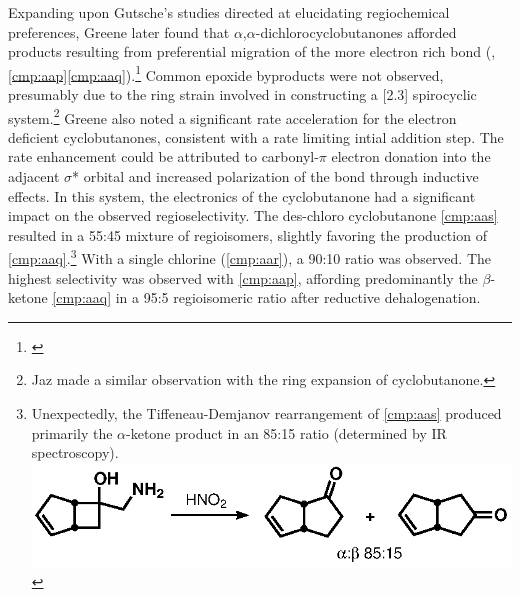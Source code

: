 Expanding upon Gutsche's studies directed at elucidating regiochemical
preferences, Greene later found that $\alpha$,$\alpha$-dichlorocyclobutanones
afforded products resulting from preferential migration of the more electron rich
 bond (,
\ref{cmp:aap}\ce{->}\ref{cmp:aaq}).\footnote{ \label{ref:greene}} Common
epoxide byproducts were not observed, presumably due to the ring strain involved in
constructing a [2.3] spirocyclic system.\footnote{Jaz made a similar observation
with the ring expansion of cyclobutanone. } Greene also noted a significant rate
acceleration for the electron deficient cyclobutanones, consistent with a rate
limiting intial addition step. The rate enhancement could be attributed to carbonyl-$\pi$
electron donation into the adjacent  $\sigma$* orbital and increased
polarization of the  bond through inductive effects. In this system, the
electronics of the cyclobutanone had a significant impact on the observed
regioselectivity. The des-chloro cyclobutanone \ref{cmp:aas} resulted in a 55:45
mixture of regioisomers, slightly favoring the production of
\ref{cmp:aaq}.\footnote{Unexpectedly, the Tiffeneau-Demjanov rearrangement of
\ref{cmp:aas} produced primarily the $\alpha$-ketone product in an 85:15 ratio
(determined by IR spectroscopy). \\\includegraphics[scale=0.7]{chp_diazobkg/images/roberts}} With a
single chlorine (\ref{cmp:aar}), a 90:10 ratio was observed. The highest
selectivity was observed with \ref{cmp:aap}, affording predominantly the
$\beta$-ketone \ref{cmp:aaq} in a 95:5 regioisomeric ratio after reductive dehalogenation.
